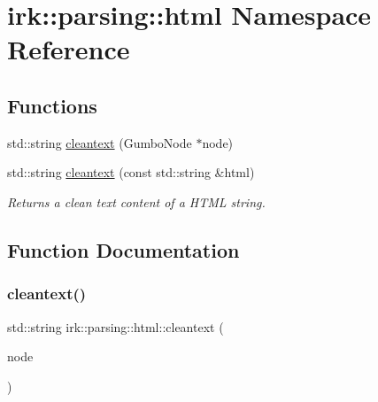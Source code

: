 \hypertarget{namespaceirk_1_1parsing_1_1html}{}\section{irk\+:\+:parsing\+:\+:html Namespace Reference}
\label{namespaceirk_1_1parsing_1_1html}
\subsection*{Functions}
\begin{DoxyCompactItemize}
\item 
std\+::string \mbox{\hyperlink{namespaceirk_1_1parsing_1_1html_a7ed9d1cea0e6298c682b56cb66ad7167}{cleantext}} (Gumbo\+Node $\ast$node)
\item 
std\+::string \mbox{\hyperlink{namespaceirk_1_1parsing_1_1html_a46fc4eebd2e7d9bd3b313dcb216355ee}{cleantext}} (const std\+::string \&html)
\begin{DoxyCompactList}\small\item\em Returns a clean text content of a H\+T\+ML string. \end{DoxyCompactList}\end{DoxyCompactItemize}


\subsection{Function Documentation}
\mbox{\label{namespaceirk_1_1parsing_1_1html_a7ed9d1cea0e6298c682b56cb66ad7167}} 
\subsubsection{\texorpdfstring{cleantext()}{cleantext()}\hspace{0.1cm}{\footnotesize\ttfamily [1/2]}}
{\footnotesize\ttfamily std\+::string irk\+::parsing\+::html\+::cleantext (\begin{DoxyParamCaption}\item[{Gumbo\+Node $\ast$}]{node }\end{DoxyParamCaption})\hspace{0.3cm}{\ttfamily [inline]}}

\mbox{\label{namespaceirk_1_1parsing_1_1html_a46fc4eebd2e7d9bd3b313dcb216355ee}} 
